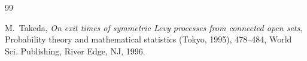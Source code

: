 \documentclass[12pt,a4paper]{article}
\renewcommand{\d}{\mathrm{d}}
\newcommand{\1}{{\bf 1}}
\begin{document}
\begin{thebibliography}{99}
 




       {M.~Takeda}, 
       \emph{On exit times of symmetric Levy processes from connected open sets}, 
       Probability theory and mathematical statistics (Tokyo, 1995), 
       478--484, World Sci. Publishing, River Edge, NJ, 1996.



%
%



%
%
%





%

\end{thebibliography}

% 
\end{document}
